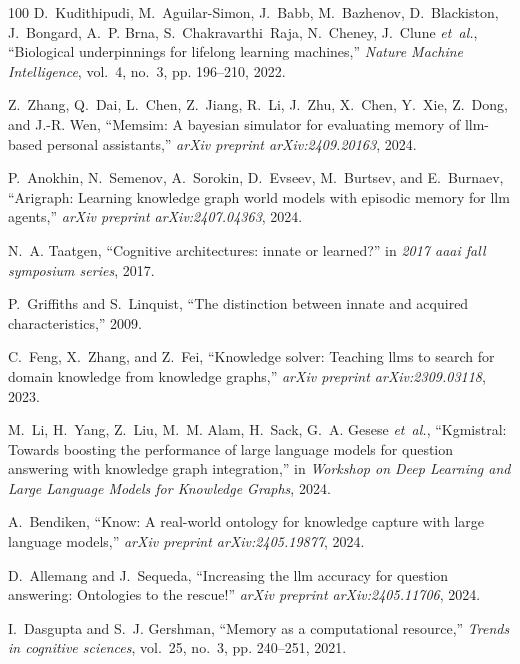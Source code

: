 \documentclass[10pt,journal,compsoc]{IEEEtran}
\begin{document}
\begin{thebibliography}{100}
	D.~Kudithipudi, M.~Aguilar-Simon, J.~Babb, M.~Bazhenov, D.~Blackiston,
	J.~Bongard, A.~P. Brna, S.~Chakravarthi~Raja, N.~Cheney, J.~Clune
	\emph{et~al.}, ``Biological underpinnings for lifelong learning machines,''
	\emph{Nature Machine Intelligence}, vol.~4, no.~3, pp. 196--210, 2022.
	
	Z.~Zhang, Q.~Dai, L.~Chen, Z.~Jiang, R.~Li, J.~Zhu, X.~Chen, Y.~Xie, Z.~Dong,
	and J.-R. Wen, ``Memsim: A bayesian simulator for evaluating memory of
	llm-based personal assistants,'' \emph{arXiv preprint arXiv:2409.20163},
	2024.
	
	P.~Anokhin, N.~Semenov, A.~Sorokin, D.~Evseev, M.~Burtsev, and E.~Burnaev,
	``Arigraph: Learning knowledge graph world models with episodic memory for
	llm agents,'' \emph{arXiv preprint arXiv:2407.04363}, 2024.
	
	N.~A. Taatgen, ``Cognitive architectures: innate or learned?'' in \emph{2017
		aaai fall symposium series}, 2017.
	
	P.~Griffiths and S.~Linquist, ``The distinction between innate and acquired
	characteristics,'' 2009.
	
	C.~Feng, X.~Zhang, and Z.~Fei, ``Knowledge solver: Teaching llms to search for
	domain knowledge from knowledge graphs,'' \emph{arXiv preprint
		arXiv:2309.03118}, 2023.
	
	M.~Li, H.~Yang, Z.~Liu, M.~M. Alam, H.~Sack, G.~A. Gesese \emph{et~al.},
	``Kgmistral: Towards boosting the performance of large language models for
	question answering with knowledge graph integration,'' in \emph{Workshop on
		Deep Learning and Large Language Models for Knowledge Graphs}, 2024.
	
	A.~Bendiken, ``Know: A real-world ontology for knowledge capture with large
	language models,'' \emph{arXiv preprint arXiv:2405.19877}, 2024.
	
	D.~Allemang and J.~Sequeda, ``Increasing the llm accuracy for question
	answering: Ontologies to the rescue!'' \emph{arXiv preprint
		arXiv:2405.11706}, 2024.
	
	I.~Dasgupta and S.~J. Gershman, ``Memory as a computational resource,''
	\emph{Trends in cognitive sciences}, vol.~25, no.~3, pp. 240--251, 2021.
	

\end{thebibliography}
\end{document}

